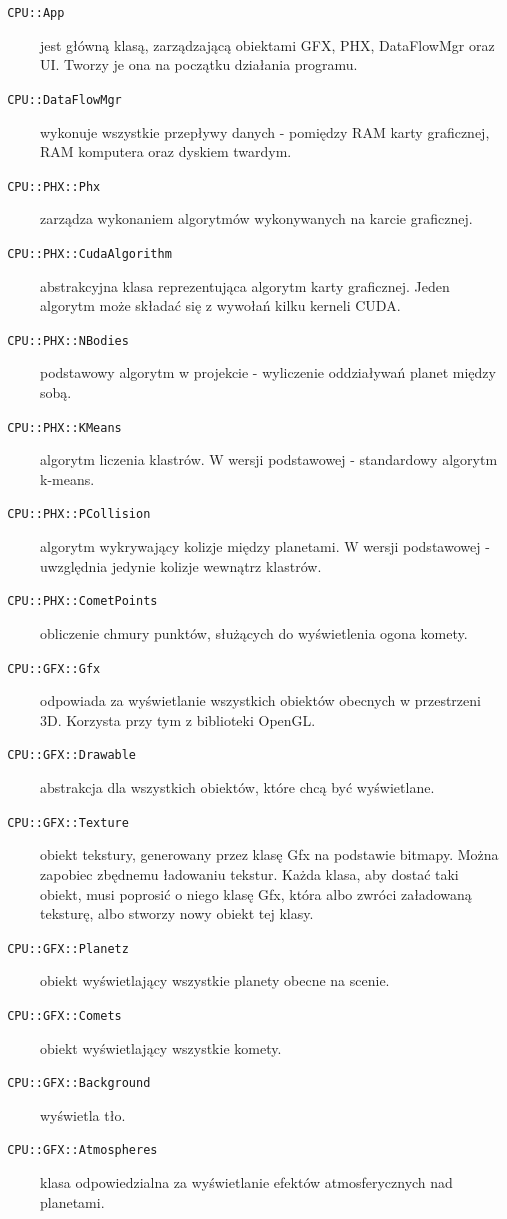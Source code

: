 \begin{description}
\item[\texttt{ CPU::App}] jest główną klasą, zarządzającą obiektami GFX, PHX, DataFlowMgr oraz UI. Tworzy je ona na początku działania programu.
\item[\texttt{ CPU::DataFlowMgr}] wykonuje wszystkie przepływy danych - pomiędzy RAM karty graficznej, RAM komputera oraz dyskiem twardym.
\item[]
\item[\texttt{ CPU::PHX::Phx}] zarządza wykonaniem algorytmów wykonywanych na karcie graficznej.
\item[\texttt{ CPU::PHX::CudaAlgorithm}] abstrakcyjna klasa reprezentująca algorytm karty graficznej. Jeden algorytm może składać się z wywołań kilku kerneli CUDA.
\item[\texttt{ CPU::PHX::NBodies}] podstawowy algorytm w projekcie - wyliczenie oddziaływań planet między sobą.
\item[\texttt{ CPU::PHX::KMeans}] algorytm liczenia klastrów. W wersji podstawowej - standardowy algorytm k-means.
\item[\texttt{ CPU::PHX::PCollision}] algorytm wykrywający kolizje między planetami. W wersji podstawowej - uwzględnia jedynie kolizje wewnątrz klastrów.
\item[\texttt{ CPU::PHX::CometPoints}] obliczenie chmury punktów, służących do wyświetlenia ogona komety.
\item[]
\item[\texttt{ CPU::GFX::Gfx}] odpowiada za wyświetlanie wszystkich obiektów obecnych w przestrzeni 3D. Korzysta przy tym z biblioteki OpenGL.
\item[\texttt{ CPU::GFX::Drawable}] abstrakcja dla wszystkich obiektów, które chcą być wyświetlane.
\item[\texttt{ CPU::GFX::Texture}] obiekt tekstury, generowany przez klasę Gfx na podstawie bitmapy. Można zapobiec zbędnemu ładowaniu tekstur. Każda klasa, aby dostać taki obiekt, musi poprosić o niego klasę Gfx, która albo zwróci załadowaną teksturę, albo stworzy nowy obiekt tej klasy.
\item[\texttt{ CPU::GFX::Planetz}] obiekt wyświetlający wszystkie planety obecne na scenie.
\item[\texttt{ CPU::GFX::Comets}] obiekt wyświetlający wszystkie komety.
\item[\texttt{ CPU::GFX::Background}] wyświetla tło.
\item[\texttt{ CPU::GFX::Atmospheres}] klasa odpowiedzialna za wyświetlanie efektów atmosferycznych nad planetami.

\end{description}
